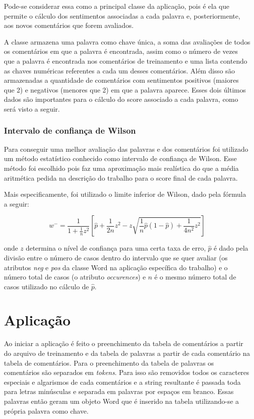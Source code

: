 \documentclass[12pt]{article}
\begin{document}
Pode-se considerar essa como a principal classe da aplicação, pois é ela que permite o cálculo dos 
sentimentos associadas a cada palavra e, posteriormente, aos novos comentários que forem avaliados.

A classe armazena uma palavra como chave única, a soma das avaliações de todos os comentários em que 
a palavra é encontrada, assim como o número de vezes que a palavra é encontrada nos comentários de 
treinamento e uma lista contendo as chaves numéricas referentes a cada um desses comentários. Além 
disso são armazenadas a quantidade de comentários com sentimentos positivos (maiores que 2) e negativos 
(menores que 2) em que a palavra aparece. Esses dois últimos dados são importantes para o cálculo do 
score associado a cada palavra, como será visto a seguir.

\subsubsection{Intervalo de confiança de Wilson}

Para conseguir uma melhor avaliação das palavras e dos comentários foi utilizado um método estatístico 
conhecido como intervalo de confiança de Wilson. Esse método foi escolhido pois faz uma aproximação 
mais realística do que a média aritmética pedida na descrição do trabalho para o score final de cada 
palavra.

Mais especificamente, foi utilizado o limite inferior de Wilson, dado pela fórmula a seguir:

$$ w^{-} = \frac{1}{1+\frac{1}{n}z^2}\left [ \hat{p} + \frac{1}{2n}z^2 - z \sqrt{\frac{1}{n} \hat{p}
   \left ( 1 - \hat{p} \right ) + \frac{1}{4n^2} z^2} \right ] $$
   
onde $z$ determina o nível de confiança para uma certa taxa de erro, $\hat{p}$ é dado pela divisão 
entre o número de casos dentro do intervalo que se quer avaliar (os atributos \emph{neg} e \emph{pos} 
da classe Word na aplicação específica do trabalho) e o número total de casos (o atributo 
\emph{occurences}) e $n$ é o mesmo número total de casos utilizado no cálculo de $\hat{p}$.


\section{Aplicação}

Ao iniciar a aplicação é feito o preenchimento da tabela de comentários a partir do arquivo de treinamento 
e da tabela de palavras a partir de cada comentário na tabela de comentários. Para o preenchimento da tabela 
de palavras os comentários são separados em \emph{tokens}. Para isso são removidos todos os caracteres especiais 
e algarismos de cada comentários e a string resultante é passada toda para letras minúsculas e separada em 
palavras por espaços em branco. Essas palavras então geram um objeto Word que é inserido na tabela utilizando-se 
a própria palavra como chave.
\end{document}
